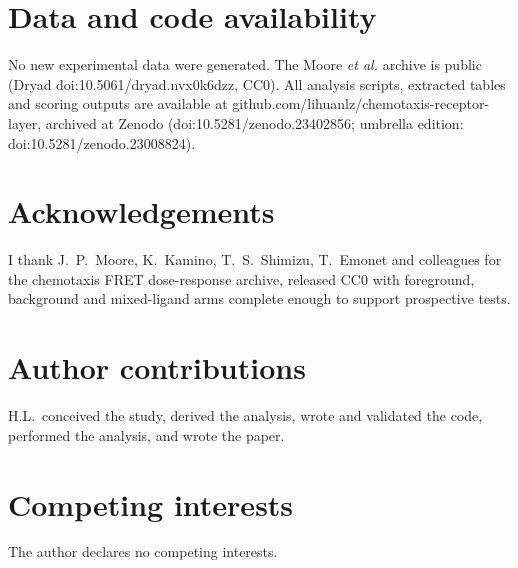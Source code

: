 ﻿\documentclass[11pt,a4paper]{article}
\begin{document}
\section*{Data and code availability}

No new experimental data were generated. The Moore \emph{et al.} archive is public (Dryad
doi:10.5061/dryad.nvx0k6dzz, CC0). All analysis scripts, extracted tables and scoring outputs are
available at github.com/lihuanlz/chemotaxis-receptor-layer, archived at Zenodo
(doi:10.5281/zenodo.23402856; umbrella edition: doi:10.5281/zenodo.23008824).

\section*{Acknowledgements}

I thank J.~P.~Moore, K.~Kamino, T.~S.~Shimizu, T.~Emonet and colleagues for the chemotaxis FRET
dose-response archive, released CC0 with foreground, background and mixed-ligand arms complete
enough to support prospective tests.

\section*{Author contributions}

H.L.\ conceived the study, derived the analysis, wrote and validated the code, performed the
analysis, and wrote the paper.

\section*{Competing interests}

The author declares no competing interests.
\end{document}
